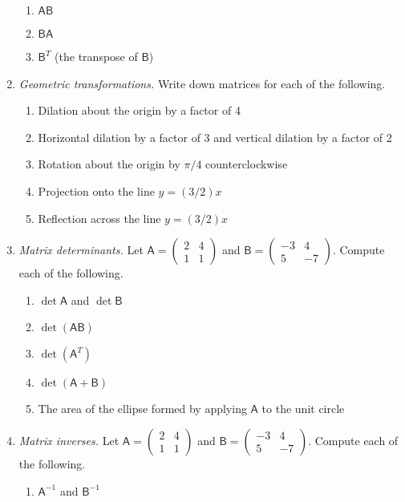 \begin{enumerate}
\begin{enumerate}
\item $\mathsf{AB}$
\item $\mathsf{BA}$
\item $\mathsf{B}^T$ (the transpose of $\mathsf{B}$)
\end{enumerate}
\item \emph{Geometric transformations.} Write down matrices for each of the following.
\begin{enumerate}
\item Dilation about the origin by a factor of 4
\item Horizontal dilation by a factor of 3 and vertical dilation by a factor of 2
\item Rotation about the origin by $\pi/4$ counterclockwise
\item Projection onto the line $y = (3/2)x$
\item Reflection across the line $y = (3/2)x$
\end{enumerate}
\newpage
\item \emph{Matrix determinants.} Let $\mathsf{A} = \begin{pmatrix} 2 & 4 \\ 1 & 1 \end{pmatrix}$ and $\mathsf{B} = \begin{pmatrix} -3 & 4 \\ 5 & -7 \end{pmatrix}$. Compute each of the following.
\begin{enumerate}
\item $\det\mathsf{A}$ and $\det\mathsf{B}$
\item $\det(\mathsf{AB})$
\item $\det(\mathsf{A}^T)$
\item $\det(\mathsf{A} + \mathsf{B})$
\item The area of the ellipse formed by applying $\mathsf{A}$ to the unit circle
\end{enumerate}
\item \emph{Matrix inverses.} Let $\mathsf{A} = \begin{pmatrix} 2 & 4 \\ 1 & 1 \end{pmatrix}$ and $\mathsf{B} = \begin{pmatrix} -3 & 4 \\ 5 & -7 \end{pmatrix}$. Compute each of the following.
\begin{enumerate}
\item $\mathsf{A}^{-1}$ and $\mathsf{B}^{-1}$

\end{enumerate}
\end{enumerate}
